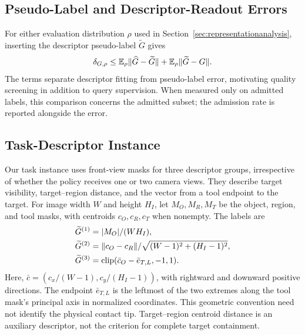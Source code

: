 \subsection{Pseudo-Label and Descriptor-Readout Errors}
\label{app:pseudolabel}
For either evaluation distribution $\rho$ used in Section~\ref{sec:representationanalysis}, inserting the descriptor pseudo-label $\widetilde G$ gives
\begin{equation}
 \delta_{G,\rho}
 \le \mathbb E_\rho\lVert\widehat G-\widetilde G\rVert
    +\mathbb E_\rho\lVert\widetilde G-G\rVert.
 \label{eq:pseudolabel}
\end{equation}
The terms separate descriptor fitting from pseudo-label error, motivating quality screening in addition to query supervision.
When measured only on admitted labels, this comparison concerns the admitted subset; the admission rate is reported alongside the error.

\subsection{Task-Descriptor Instance}
\label{app:descriptorinstance}
Our task instance uses front-view masks for three descriptor groups, irrespective of whether the policy receives one or two camera views.
They describe target visibility, target--region distance, and the vector from a tool endpoint to the target.
For image width $W$ and height $H_I$, let $M_O,M_R,M_T$ be the object, region, and tool masks, with centroids $c_O,c_R,c_T$ when nonempty.
The labels are
\begin{equation}
 \begin{aligned}
 \widetilde G^{(1)}&=|M_O|/(WH_I),\\
 \widetilde G^{(2)}&=\lVert c_O-c_R\rVert/
       \sqrt{(W-1)^2+(H_I-1)^2},\\
 \widetilde G^{(3)}&=\operatorname{clip}(\bar c_O-\bar e_{T,L},-1,1).
 \end{aligned}
 \label{eq:methodgeometry}
\end{equation}
Here, $\bar c=(c_x/(W-1),c_y/(H_I-1))$, with rightward and downward positive directions.
The endpoint $\bar e_{T,L}$ is the leftmost of the two extremes along the tool mask's principal axis in normalized coordinates.
This geometric convention need not identify the physical contact tip.
Target--region centroid distance is an auxiliary descriptor, not the criterion for complete target containment.

